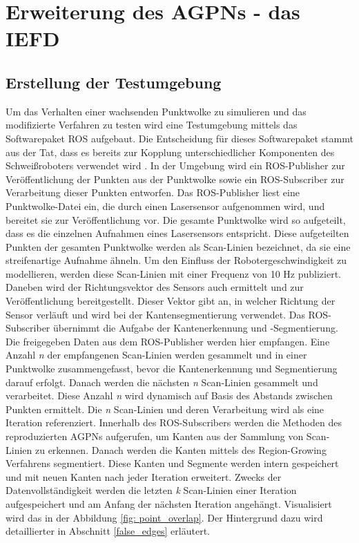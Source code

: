 \section{Erweiterung des AGPNs - das IEFD}
\subsection{Erstellung der Testumgebung}
Um das Verhalten einer wachsenden Punktwolke zu simulieren und das modifizierte Verfahren zu testen wird eine Testumgebung mittels das Softwarepaket ROS aufgebaut. Die Entscheidung für dieses Softwarepaket stammt aus der Tat, dass es bereits zur Kopplung unterschiedlicher Komponenten des Schweißroboters verwendet wird \autocite[39]{savla_intelligente_2022}. In der Umgebung wird ein ROS-Publisher zur Veröffentlichung der Punkten aus der Punktwolke sowie ein ROS-Subscriber zur Verarbeitung dieser Punkten entworfen. Das ROS-Publisher liest eine Punktwolke-Datei ein, die durch einen Lasersensor aufgenommen wird, und bereitet sie zur Veröffentlichung vor. Die gesamte Punktwolke wird so aufgeteilt, dass es die einzelnen Aufnahmen eines Lasersensors entspricht. Diese aufgeteilten Punkten der gesamten Punktwolke werden als Scan-Linien bezeichnet, da sie eine streifenartige Aufnahme ähneln. Um den Einfluss der Robotergeschwindigkeit zu modellieren, werden diese Scan-Linien mit einer Frequenz von 10 Hz publiziert. Daneben wird der Richtungsvektor des Sensors auch ermittelt und zur Veröffentlichung bereitgestellt. Dieser Vektor gibt an, in welcher Richtung der Sensor verläuft und wird bei der Kantensegmentierung verwendet. Das ROS-Subscriber übernimmt die Aufgabe der Kantenerkennung und -Segmentierung. Die freigegeben Daten aus dem ROS-Publisher werden hier empfangen. Eine Anzahl \textit{n} der empfangenen Scan-Linien werden gesammelt und in einer Punktwolke zusammengefasst, bevor die Kantenerkennung und Segmentierung darauf erfolgt. Danach werden die nächsten \textit{n} Scan-Linien gesammelt und verarbeitet. Diese Anzahl \textit{n} wird dynamisch auf Basis des Abstands zwischen Punkten ermittelt. Die \textit{n} Scan-Linien und deren Verarbeitung wird als eine Iteration referenziert. Innerhalb des ROS-Subscribers werden die Methoden des reproduzierten AGPNs aufgerufen, um Kanten aus der Sammlung von Scan-Linien zu erkennen. Danach werden die Kanten mittels des Region-Growing Verfahrens segmentiert. Diese Kanten und Segmente werden intern gespeichert und mit neuen Kanten nach jeder Iteration erweitert. Zwecks der Datenvollständigkeit werden die letzten \textit{k} Scan-Linien einer Iteration aufgespeichert und am Anfang der nächsten Iteration angehängt. Visualisiert wird das in der Abbildung \ref{fig: point_overlap}. Der Hintergrund dazu wird detaillierter in Abschnitt \ref{false_edges} erläutert.

